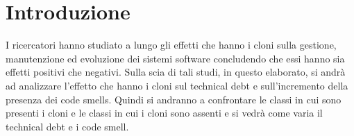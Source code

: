 \chapter{Introduzione}\label{cap2}
I ricercatori hanno studiato a lungo gli effetti che hanno i cloni sulla gestione, manutenzione ed evoluzione dei sistemi software concludendo che essi hanno sia effetti positivi che negativi. Sulla scia di tali studi, in questo elaborato, si andrà ad analizzare l'effetto che hanno i cloni sul technical debt e sull'incremento della presenza dei code smells. Quindi si andranno a confrontare le classi in cui sono presenti i cloni e le classi in cui i cloni sono assenti e si vedrà come varia il technical debt e i code smell. 



